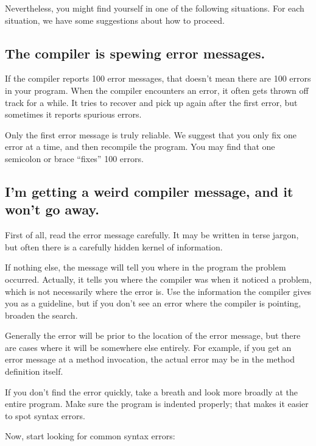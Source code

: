 \documentclass[12pt]{book}
\theoremstyle{exercise}
\begin{document}
Nevertheless, you might find yourself in one of the following situations.
For each situation, we have some suggestions about how to proceed.


\subsection*{The compiler is spewing error messages.}


If the compiler reports 100 error messages, that doesn't mean there are 100 errors in your program.
When the compiler encounters an error, it often gets thrown off track for a while.
It tries to recover and pick up again after the first error, but sometimes it reports spurious errors.

Only the first error message is truly reliable.
We suggest that you only fix one error at a time, and then recompile the program.
You may find that one semicolon or brace ``fixes'' 100 errors.


\subsection*{I'm getting a weird compiler message, and it won't go away.}

First of all, read the error message carefully.
It may be written in terse jargon, but often there is a carefully hidden kernel of information.

If nothing else, the message will tell you where in the program the problem occurred.
Actually, it tells you where the compiler was when it noticed a problem, which is not necessarily where the error is.
Use the information the compiler gives you as a guideline, but if you don't see an error where the compiler is pointing, broaden the search.

Generally the error will be prior to the location of the error message, but there are cases where it will be somewhere else entirely.
For example, if you get an error message at a method invocation, the actual error may be in the method definition itself.

If you don't find the error quickly, take a breath and look more broadly at the entire program.
Make sure the program is indented properly; that makes it easier to spot syntax errors.

Now, start looking for common syntax errors:

\end{document}
